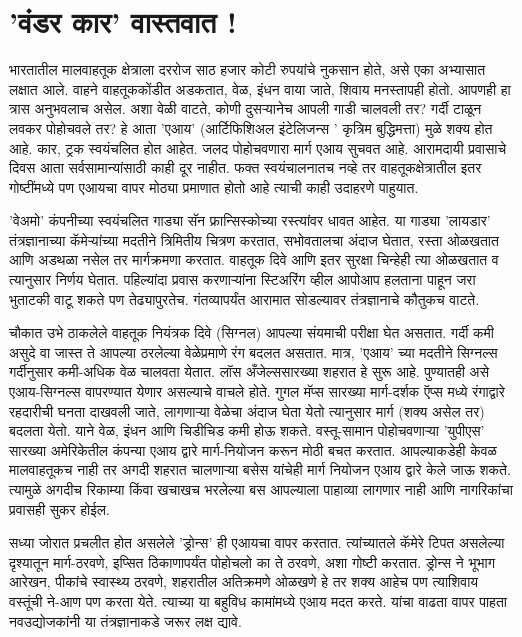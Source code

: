 \chapter{'वंडर कार' वास्तवात !}

भारतातील मालवाहतूक क्षेत्राला दररोज साठ हजार कोटी रुपयांचे नुकसान होते, असे एका अभ्यासात लक्षात आले. वाहने वाहतूककोंडीत अडकतात, वेळ, इंधन वाया जाते, शिवाय मनस्तापही होतो. आपणही हा त्रास अनुभवलाच असेल. अशा वेळी वाटते, कोणी दुसऱ्यानेच आपली गाडी चालवली तर? गर्दी टाळून लवकर पोहोचवले तर? हे आता 'एआय' (आर्टिफिशिअल इंटेलिजन्स ' कृत्रिम बुद्धिमत्ता) मुळे शक्य होत आहे. कार, ट्रक स्वयंचलित होत आहेत. जलद पोहोचवणारा मार्ग एआय सुचवत आहे. आरामदायी प्रवासाचे दिवस आता सर्वसामान्यांसाठी काही दूर नाहीत. फक्त स्वयंचालनातच नव्हे तर वाहतूकक्षेत्रातील इतर गोष्टींमध्ये पण एआयचा वापर मोठ्या प्रमाणात होतो आहे त्याची काही उदाहरणे पाहुयात.

'वेअमो' कंपनीच्या स्वयंचलित गाड्या सॅन फ्रान्सिस्कोच्या रस्त्यांवर धावत आहेत. या गाड्या 'लायडार' तंत्रज्ञानाच्या कॅमेर्‍यांच्या मदतीने त्रिमितीय चित्रण करतात, सभोवतालचा अंदाज घेतात, रस्ता ओळखतात आणि अडथळा नसेल तर मार्गक्रमणा करतात. वाहतूक दिवे आणि इतर सुरक्षा चिन्हेही त्या ओळखतात व त्यानुसार निर्णय घेतात. पहिल्यांदा प्रवास करणाऱ्यांना स्टिअरिंग व्हील आपोआप हलताना पाहून जरा भुताटकी वाटू शकते पण तेढ्यापुरतेच. गंतव्यापर्यंत आरामात सोडल्यावर तंत्रज्ञानाचे कौतुकच वाटते.

चौकात उभे ठाकलेले वाहतूक नियंत्रक दिवे (सिग्नल) आपल्या संयमाची परीक्षा घेत असतात. गर्दी कमी असुदे वा जास्त ते आपल्या ठरलेल्या वेळेप्रमाणे रंग बदलत असतात. मात्र, 'एआय' च्या मदतीने सिग्नल्स गर्दीनुसार कमी-अधिक वेळ चालवता येतात. लॉस अँजेल्ससारख्या शहरात हे सुरू आहे. पुण्यातही असे एआय-सिग्नल्स वापरण्यात येणार असल्याचे वाचले होते. गुगल मॅप्स सारख्या मार्ग-दर्शक ऍप्स मध्ये रंगाद्वारे रहदारीची घनता दाखवली जाते, लागणाऱ्या वेळेचा अंदाज घेता येतो त्यानुसार मार्ग (शक्य असेल तर) बदलता येतो. याने वेळ, इंधन आणि चिडीचिड कमी होऊ शकते. वस्तू-सामान पोहोचवणाऱ्या 'युपीएस' सारख्या अमेरिकेतील कंपन्या एआय द्वारे मार्ग-नियोजन करून मोठी बचत करतात. आपल्याकडेही केवळ मालवाहतूकच नाही तर अगदी शहरात चालणाऱ्या बसेस यांचेही मार्ग नियोजन एआय द्वारे केले जाऊ शकते. त्यामुळे अगदीच रिकाम्या किंवा खचाखच भरलेल्या बस आपल्याला पाहाव्या लागणार नाही आणि नागरिकांचा प्रवासही सुकर होईल.

सध्या जोरात प्रचलीत होत असलेले 'ड्रोन्स' ही एआयचा वापर करतात. त्यांच्यातले कॅमेरे टिपत असलेल्या दृश्यातून मार्ग-ठरवणे, इप्सित ठिकाणापर्यंत पोहोचलो का ते ठरवणे, अशा गोष्टी करतात. ड्रोन्स ने भूभाग आरेखन, पीकांचे स्वास्थ्य ठरवणे, शहरातील अतिक्रमणे ओळखणे हे तर शक्य आहेच पण त्याशिवाय वस्तूंची ने-आण पण करता येते. त्याच्या या बहुविध कामांमध्ये एआय मदत करते. यांचा वाढता वापर पाहता नवउद्योजकांनी या तंत्रज्ञानाकडे जरूर लक्ष द्यावे.

